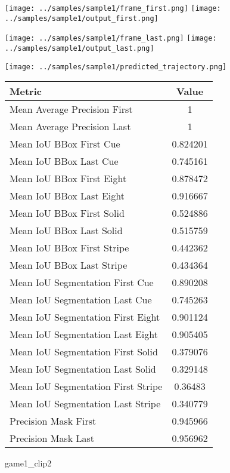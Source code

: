 \begin{figure}
\texttt{[image: ../samples/sample1/frame\_first.png]}
\texttt{[image: ../samples/sample1/output\_first.png]}\par
\texttt{[image: ../samples/sample1/frame\_last.png]}
\texttt{[image: ../samples/sample1/output\_last.png]}\par
\centering
\texttt{[image: ../samples/sample1/predicted\_trajectory.png]}
\caption{game1\_clip2}
\vspace{10pt}
\begin{tabular}{|l|c|}
\hline
\textbf{Metric} & \textbf{Value} \\
\hline
Mean Average Precision First & 1 \\
Mean Average Precision Last & 1 \\
\hline
Mean IoU BBox First Cue & 0.824201 \\
Mean IoU BBox Last Cue & 0.745161 \\
Mean IoU BBox First Eight & 0.878472 \\
Mean IoU BBox Last Eight & 0.916667 \\
Mean IoU BBox First Solid & 0.524886 \\
Mean IoU BBox Last Solid & 0.515759 \\
Mean IoU BBox First Stripe & 0.442362 \\
Mean IoU BBox Last Stripe & 0.434364 \\
\hline
Mean IoU Segmentation First Cue & 0.890208 \\
Mean IoU Segmentation Last Cue & 0.745263 \\
Mean IoU Segmentation First Eight & 0.901124 \\
Mean IoU Segmentation Last Eight & 0.905405 \\
Mean IoU Segmentation First Solid & 0.379076 \\
Mean IoU Segmentation Last Solid & 0.329148 \\
Mean IoU Segmentation First Stripe & 0.36483 \\
Mean IoU Segmentation Last Stripe & 0.340779 \\
\hline
Precision Mask First & 0.945966 \\
Precision Mask Last & 0.956962 \\
\hline
\end{tabular}
\end{figure}


